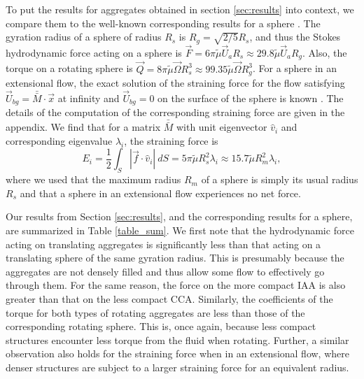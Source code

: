 To put the results for aggregates obtained in section \ref{sec:results} into context, we compare them to the well-known corresponding results for a sphere \cite{guazzelli_physical_2011}. 
The gyration radius of a sphere of radius $R_s$ is $R_g = \sqrt{2/5} R_s$, and thus the Stokes hydrodynamic force acting on a sphere is $\vec{F} = 6 \pi \tilde{\mu} \vec{U}_a R_s \approx 29.8 \tilde{\mu} \vec{U}_a R_g$.  Also, the torque on a rotating sphere is $\vec{Q} = 8 \pi \tilde{\mu} \vec{\Omega} R_s^3 \approx 99.35 \tilde{\mu} \vec{\Omega} R_g^3$. For a sphere in an extensional flow, the exact solution of the straining force for the flow satisfying $\vec{U}_{bg} = \bar{\bar{M}}\cdot \vec{x}$ at infinity and $\vec{U}_{bg} = 0$ on the surface of the sphere is known \cite{guazzelli_physical_2011}. The details of the computation of the corresponding straining force are given in the appendix. We find that for a matrix $\bar{\bar{M}}$ with unit eigenvector $\hat{v}_i$ and corresponding eigenvalue $\lambda_i$, the straining force is
\[
E_{i}  = \frac{1}{2} \int_S | \vec{f} \cdot \hat{v}_i | \ dS = 5  \pi \tilde{\mu} R_s^2 \lambda_i \approx 15.7  \tilde{\mu} R_m^2  \lambda_i,
\] 
where we used that the maximum radius $R_m$ of a sphere is simply its usual radius $R_s$ and that a sphere in an extensional flow experiences no net force. 


Our results from Section \ref{sec:results}, and the corresponding results for a sphere, are summarized in Table  \ref{table_sum}. We first note that the hydrodynamic force acting on translating aggregates is significantly less than that acting on a translating sphere of the same gyration radius. This is presumably because the aggregates are not densely filled and thus allow some flow to effectively go through them. For the same reason, the force on the more compact IAA is also greater than that on the less compact CCA.
Similarly, the coefficients of the torque for both types of rotating aggregates are less than those of the corresponding rotating sphere. This is, once again, because less compact structures encounter less torque from the fluid when rotating. Further, a similar observation also holds for the straining force when in an extensional flow, where denser structures are subject to a larger straining force for an equivalent radius. 

